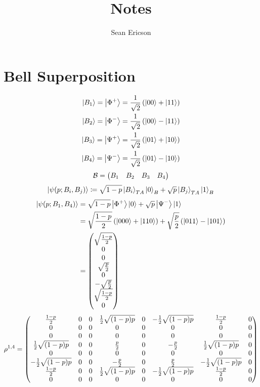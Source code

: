 \documentclass[12pt]{article}
\begin{document}
	
\title{Notes}
\author{Sean Ericson}
\maketitle

\section*{Bell Superposition}
\begin{align*}
    \ket{B_1} = \ket{\Phi^+} &= \frac{1}{\sqrt{2}}\left(\ket{00} + \ket{11}\right) \\
    \ket{B_2} = \ket{\Phi^-} &= \frac{1}{\sqrt{2}}\left(\ket{00} - \ket{11}\right) \\
    \ket{B_3} = \ket{\Psi^+} &= \frac{1}{\sqrt{2}}\left(\ket{01} + \ket{10}\right) \\
    \ket{B_4} = \ket{\Psi^-} &= \frac{1}{\sqrt{2}}\left(\ket{01} - \ket{10}\right) \\
\end{align*}
\[ \mathcal{B} = \mqty(B_1 & B_2 & B_3 & B_4) \]
\[ \ket{\psi(p;B_i,B_j)} \coloneqq \sqrt{1-p}\ket{B_i}_{TA}\ket{0}_B + \sqrt{p}\ket{B_j}_{TA}\ket{1}_B \]
\begin{align*}
    \ket{\psi(p;B_1,B_4)} &= \sqrt{1-p}\ket{\Phi^+}\ket{0} + \sqrt{p}\ket{\Psi^-}\ket{1} \\
    &= \sqrt{\frac{1-p}{2}}\left(\ket{000} + \ket{110}\right) + \sqrt{\frac{p}{2}}\left(\ket{011} - \ket{101}\right) \\
    &= \mqty( \sqrt{\frac{1-p}{2}} \\ 0 \\ 0 \\ \sqrt{\frac{p}{2}} \\ 0 \\ -\sqrt{\frac{p}{2}} \\ \sqrt{\frac{1-p}{2}} \\ 0) 
\end{align*}
\begin{align*}
    \rho^{1,4} &= \mqty(
        \frac{1-p}{2} & 0 & 0 & \frac{1}{2} \sqrt{(1-p) p} & 0 & -\frac{1}{2} \sqrt{(1-p) p} & \frac{1-p}{2} & 0 \\
        0 & 0 & 0 & 0 & 0 & 0 & 0 & 0 \\
        0 & 0 & 0 & 0 & 0 & 0 & 0 & 0 \\
        \frac{1}{2} \sqrt{(1-p) p} & 0 & 0 & \frac{p}{2} & 0 & -\frac{p}{2} & \frac{1}{2} \sqrt{(1-p) p} & 0 \\
        0 & 0 & 0 & 0 & 0 & 0 & 0 & 0 \\
        -\frac{1}{2} \sqrt{(1-p) p} & 0 & 0 & -\frac{p}{2} & 0 & \frac{p}{2} & -\frac{1}{2} \sqrt{(1-p) p} & 0 \\
        \frac{1-p}{2} & 0 & 0 & \frac{1}{2} \sqrt{(1-p) p} & 0 & -\frac{1}{2} \sqrt{(1-p) p} & \frac{1-p}{2} & 0 \\
        0 & 0 & 0 & 0 & 0 & 0 & 0 & 0
    ) \\
\end{align*} 
\end{document}
